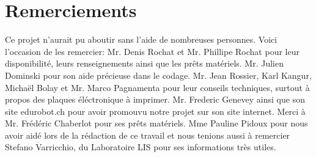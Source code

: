 \documentclass[a4paper,11pt]{report}
\begin{document}
{\clearpage

\section*{Remerciements}
Ce projet n'aurait pu aboutir sans l'aide de nombreuses personnes. Voici l'occasion de les remercier: Mr. Denis Rochat et Mr. Phillipe Rochat pour leur disponibilité, leurs renseignements ainsi que les prêts matériels. Mr. Julien Dominski pour son aide précieuse dans le codage. Mr. Jean Rossier, Karl Kangur, Michaël Bolay et Mr. Marco Pagnamenta pour leur conseils techniques, surtout à propos des plaques éléctronique à imprimer. Mr. Frederic Genevey ainsi que son site edurobot.ch pour avoir promouvu notre projet sur son site internet. Merci à Mr. Frédéric Chaberlot pour ses prêts matériels. Mme Pauline Pidoux pour nous avoir aidé lors de la rédaction de ce travail et nous tenions aussi à remercier Stefano Varricchio, du Laboratoire LIS pour ses informations très utiles.

}
\end{document}
